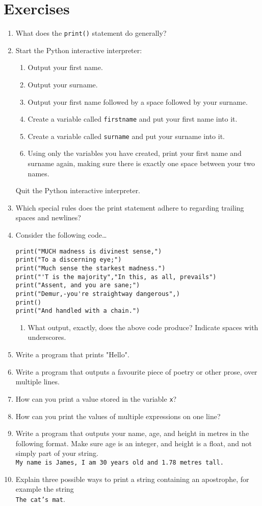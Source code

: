 \section{Exercises}
\begin{enumerate}
	\item What does the \texttt{print()} statement do generally?
	\item Start the Python interactive interpreter:     
\begin{enumerate}
	\item Output your first name.
	\item Output your surname.
	\item Output your first name followed by a space followed by         your surname.
	\item Create a variable called \texttt{firstname} and put your first         name into it.
	\item Create a variable called \texttt{surname} and put your surname         into it.
	\item Using only the variables you have created, print your         first name and surname again, making sure there is exactly         one space between your two names.
\end{enumerate}     Quit the Python interactive interpreter.
	\item Which special rules does the print statement adhere to regarding     trailing spaces and newlines?
    \item Consider the following code\ldots
\begin{lstlisting}
print("MUCH madness is divinest sense,")
print("To a discerning eye;")
print("Much sense the starkest madness.")
print("'T is the majority","In this, as all, prevails")
print("Assent, and you are sane;")
print("Demur,-you're straightway dangerous",)
print()
print("And handled with a chain.")\end{lstlisting}
\begin{enumerate}
	\item What output, exactly, does the above code produce? Indicate     spaces with underscores.
\end{enumerate}
\item Write a program that prints "Hello".
\item Write a program that outputs a favourite piece of poetry or other     prose, over multiple lines.
\item How can you print a value stored in the variable \texttt{x}?
\item How can you print the values of multiple expressions on one line?
\item Write a program that outputs your name, age, and height in     metres in the following format. Make sure age is an integer, and     height is a float, and not simply part of your string.
\\
\texttt{My name is James, I am 30 years old and 1.78 metres       tall.}
\item Explain three possible ways to print a string containing an     apostrophe, for example the string
\\
\texttt{The cat's       mat}.
\end{enumerate}   
